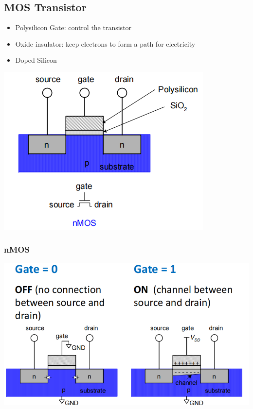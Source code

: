 \documentclass[12pt]{article}
\begin{document}
\subsection{MOS Transistor}
\begin{itemize}
    \item Polysilicon Gate: control the transistor
    \item Oxide insulator: keep electrons to form a path for electricity
    \item Doped Silicon
\end{itemize}
\includegraphics[width=\textwidth]{Transistor.png}
\subsubsection{nMOS}
\includegraphics[width=\textwidth]{nMOS.png}
\end{document}
